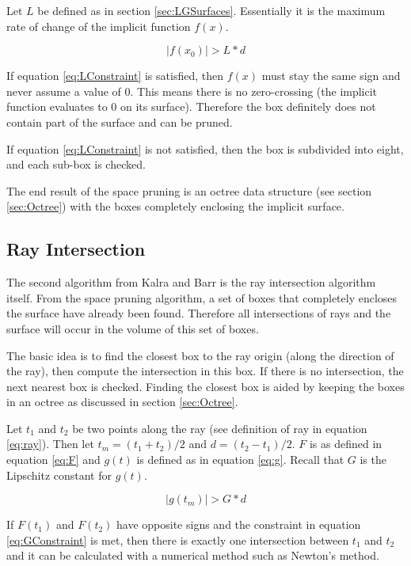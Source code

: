 \documentclass[conference]{acmsiggraph}
\begin{document}
Let $L$ be defined as in section \ref{sec:LGSurfaces}.  Essentially it is
the maximum rate of change of the implicit function $f(x)$.  

\begin{equation}
\label{eq:LConstraint}
|f(x_0)| > L * d
\end{equation}

If equation \ref{eq:LConstraint} is satisfied, then $f(x)$ must stay 
the same sign and never assume a value of 0.  
This means there is no zero-crossing (the implicit function
evaluates to 0 on its surface).  Therefore the box definitely does not
contain part of the surface and can be pruned.  

If equation \ref{eq:LConstraint} is not satisfied, then the box is 
subdivided into eight, and each sub-box is checked.

The end result of the space pruning is an octree data structure 
(see section \ref{sec:Octree}) with the boxes completely enclosing the
implicit surface.

\subsection{Ray Intersection}
\label{sec:RayIntersection}

The second algorithm from Kalra and Barr is the ray intersection algorithm 
itself.  From the space pruning algorithm, a set of boxes that completely 
encloses the surface have already been found.  Therefore all intersections
of rays and the surface will occur in the volume of this set of boxes.

The basic idea is to find the closest box to the ray origin (along the 
direction of the ray), then compute the intersection in this box.  If 
there is no intersection, the next nearest box is checked.  Finding 
the closest box is aided by keeping the boxes in an octree as
discussed in section \ref{sec:Octree}.

Let $t_1$ and $t_2$ be two points along the ray (see definition of ray
in equation \ref{eq:ray}).  Then let $t_m = (t_1 + t_2) / 2$ and 
$d = (t_2 - t_1) / 2$.  
$F$ is as defined in equation \ref{eq:F} and $g(t)$ is defined as in 
equation \ref{eq:g}.  Recall that $G$ is the Lipschitz constant for $g(t)$.

\begin{equation}
\label{eq:GConstraint}
|g(t_m)| > G * d
\end{equation}

If $F(t_1)$ and $F(t_2)$ have opposite signs and the constraint in 
equation \ref{eq:GConstraint} is met, then there is exactly one 
intersection between $t_1$ and $t_2$ and it can be calculated with
a numerical method such as Newton's method.
\end{document}
